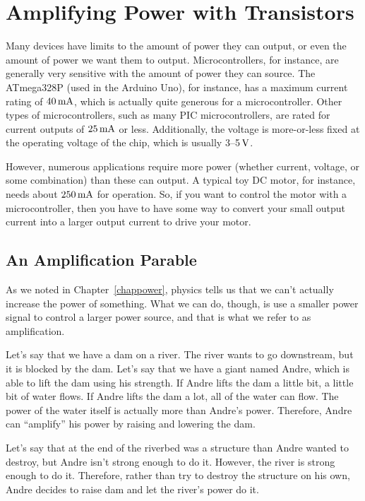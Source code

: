 \chapter{Amplifying Power with Transistors}

Many devices have limits to the amount of power they can output, or even the amount of power we want them to output.
Microcontrollers, for instance, are generally very sensitive with the amount of power they can source.
The ATmega328P (used in the Arduino Uno), for instance, has a maximum current rating of $40\,\si{\milli\ampere}$, which is actually quite generous for a microcontroller.  
Other types of microcontrollers, such as many PIC microcontrollers, are rated for current outputs of $25\,\si{\milli\ampere}$ or less.
Additionally, the voltage is more-or-less fixed at the operating voltage of the chip, which is usually 3--5$\,\si{\volt}$.

However, numerous applications require more power (whether current, voltage, or some combination) than these can output.
A typical toy DC motor, for instance, needs about $250\,\si{\milli\ampere}$ for operation.
So, if you want to control the motor with a microcontroller, then you have to have some way to convert your small output current into a larger output current to drive your motor.

\section{An Amplification Parable}

As we noted in Chapter~\ref{chappower}, physics tells us that we can't actually increase the power of something.  
What we can do, though, is use a smaller power signal to control a larger power source, and that is what we refer to as amplification.

Let's say that we have a dam on a river.
The river wants to go downstream, but it is blocked by the dam.
Let's say that we have a giant named Andre, which is able to lift the dam using his strength.
If Andre lifts the dam a little bit, a little bit of water flows.
If Andre lifts the dam a lot, all of the water can flow.
The power of the water itself is actually more than Andre's power.
Therefore, Andre can ``amplify'' his power by raising and lowering the dam.

Let's say that at the end of the riverbed was a structure than Andre wanted to destroy, but Andre isn't strong enough to do it.
However, the river is strong enough to do it.
Therefore, rather than try to destroy the structure on his own, Andre decides to raise dam and let the river's power do it.

